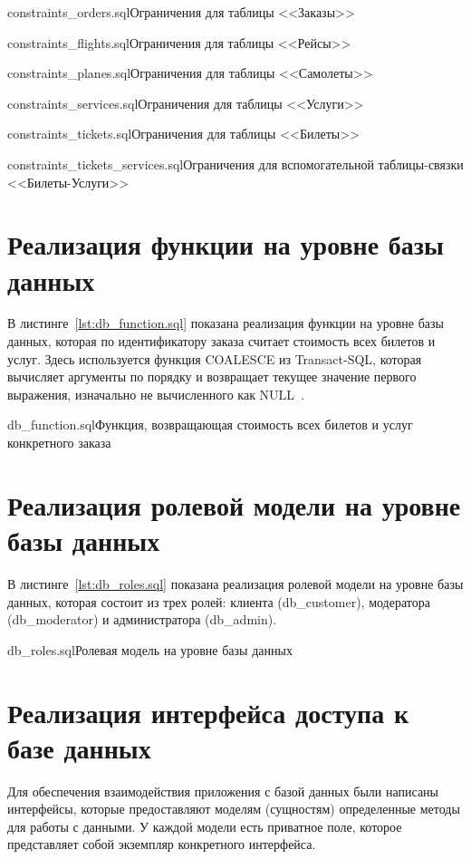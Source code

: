 \documentclass{bmstu}
\begin{document}
{constraints_orders.sql}{Ограничения для таблицы <<Заказы>>}

{constraints_flights.sql}{Ограничения для таблицы <<Рейсы>>}

{constraints_planes.sql}{Ограничения для таблицы <<Самолеты>>}

{constraints_services.sql}{Ограничения для таблицы <<Услуги>>}

{constraints_tickets.sql}{Ограничения для таблицы <<Билеты>>}

{constraints_tickets_services.sql}{Ограничения для вспомогательной таблицы-связки <<Билеты-Услуги>>}

\pagebreak
\section{Реализация функции на уровне базы данных}

В листинге~\ref{lst:db_function.sql} показана реализация функции на уровне базы данных, которая по идентификатору заказа считает стоимость всех билетов и услуг. 
Здесь используется функция COALESCE из Transact-SQL, которая вычисляет аргументы по порядку и возвращает текущее значение первого выражения, изначально не вычисленного как \mbox{NULL~\cite{Coalesce}}.

{db_function.sql}{Функция, возвращающая стоимость всех билетов и услуг конкретного заказа}

\pagebreak
\section{Реализация ролевой модели на уровне базы данных}

В листинге~\ref{lst:db_roles.sql} показана реализация ролевой модели на уровне базы данных, которая состоит из трех ролей: клиента (db\_customer), модератора (db\_moderator) и администратора (db\_admin).

{db_roles.sql}{Ролевая модель на уровне базы данных}

\section{Реализация интерфейса доступа к базе данных}

Для обеспечения взаимодействия приложения с базой данных были написаны интерфейсы, которые предоставляют моделям (сущностям) определенные методы для работы с данными. 
У каждой модели есть приватное поле, которое представляет собой экземпляр конкретного интерфейса.
\end{document}
